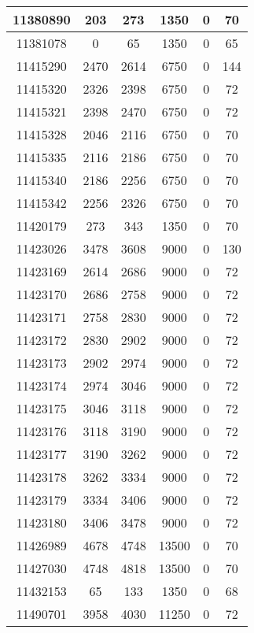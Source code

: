 \begin{appendices}
\begin{center}
\begin{longtable}{|c|c|c|c|c|c|}
11380890 & 203   & 273   & 1350  & 0     & 70  \\ \hline
11381078 & 0     & 65    & 1350  & 0     & 65  \\ \hline
11415290 & 2470  & 2614  & 6750  & 0     & 144 \\ \hline
11415320 & 2326  & 2398  & 6750  & 0     & 72  \\ \hline
11415321 & 2398  & 2470  & 6750  & 0     & 72  \\ \hline
11415328 & 2046  & 2116  & 6750  & 0     & 70  \\ \hline
11415335 & 2116  & 2186  & 6750  & 0     & 70  \\ \hline
11415340 & 2186  & 2256  & 6750  & 0     & 70  \\ \hline
11415342 & 2256  & 2326  & 6750  & 0     & 70  \\ \hline
11420179 & 273   & 343   & 1350  & 0     & 70  \\ \hline
11423026 & 3478  & 3608  & 9000  & 0     & 130 \\ \hline
11423169 & 2614  & 2686  & 9000  & 0     & 72  \\ \hline
11423170 & 2686  & 2758  & 9000  & 0     & 72  \\ \hline
11423171 & 2758  & 2830  & 9000  & 0     & 72  \\ \hline
11423172 & 2830  & 2902  & 9000  & 0     & 72  \\ \hline
11423173 & 2902  & 2974  & 9000  & 0     & 72  \\ \hline
11423174 & 2974  & 3046  & 9000  & 0     & 72  \\ \hline
11423175 & 3046  & 3118  & 9000  & 0     & 72  \\ \hline
11423176 & 3118  & 3190  & 9000  & 0     & 72  \\ \hline
11423177 & 3190  & 3262  & 9000  & 0     & 72  \\ \hline
11423178 & 3262  & 3334  & 9000  & 0     & 72  \\ \hline
11423179 & 3334  & 3406  & 9000  & 0     & 72  \\ \hline
11423180 & 3406  & 3478  & 9000  & 0     & 72  \\ \hline
11426989 & 4678  & 4748  & 13500 & 0     & 70  \\ \hline
11427030 & 4748  & 4818  & 13500 & 0     & 70  \\ \hline
11432153 & 65    & 133   & 1350  & 0     & 68  \\ \hline
11490701 & 3958  & 4030  & 11250 & 0     & 72  \\ \hline

\end{longtable}
\end{center}
\end{appendices}
